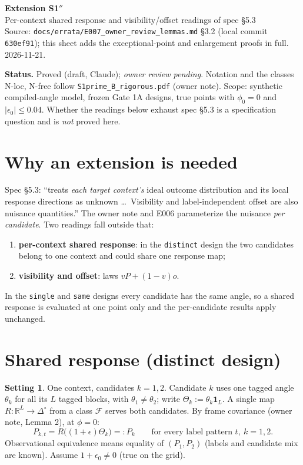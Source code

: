\documentclass[11pt,a4paper]{article}
\newcommand{\statusbox}[1]{\par\smallskip\noindent\colorbox{boxgray}{\parbox{\dimexpr\linewidth-2\fboxsep}{\small #1}}\par\smallskip}
\theoremstyle{plain}
\theoremstyle{definition}
\newtheorem*{setting}{Setting}
\theoremstyle{remark}
\newcommand{\eps}{\epsilon}
\newcommand{\R}{\mathbb{R}}
\newcommand{\simp}{\Delta^{\circ}}
\begin{document}
\begin{center}
{\LARGE\bfseries Extension S1$''$}\\[4pt]
{\large Per-context shared response and visibility/offset readings of spec \S5.3}\\[8pt]
{\small Source: \texttt{docs/errata/E007\_owner\_review\_lemmas.md} \S3.2 (local commit \texttt{630ef91}); this sheet adds the exceptional-point and enlargement proofs in full. 2026-11-21.}
\end{center}

\statusbox{\textbf{Status.} Proved (draft, Claude); \emph{owner review pending}. Notation and the
classes N-loc, N-free follow \texttt{S1prime\_B\_rigorous.pdf} (owner note). Scope: synthetic
compiled-angle model, frozen Gate 1A designs, true points with $\phi_0=0$ and
$|\eps_0|\le 0.04$. Whether the readings below exhaust spec \S5.3 is a specification
question and is \emph{not} proved here.}

\section{Why an extension is needed}
Spec \S5.3: ``treats \emph{each target context's} ideal outcome distribution and its local
response directions as unknown \dots\ Visibility and label-independent offset are also nuisance
quantities.'' The owner note and E006 parameterize the nuisance \emph{per candidate}. Two
readings fall outside that:
\begin{enumerate}[label=(\alph*),itemsep=2pt]
\item \textbf{per-context shared response}: in the \texttt{distinct} design the two candidates
belong to one context and could share one response map;
\item \textbf{visibility and offset}: laws $vP+(1-v)o$.
\end{enumerate}
In the \texttt{single} and \texttt{same} designs every candidate has the same angle, so a shared
response is evaluated at one point only and the per-candidate results apply unchanged.

\section{Shared response (distinct design)}

\begin{setting}
One context, candidates $k=1,2$. Candidate $k$ uses one tagged angle $\theta_k$ for all its
$L$ tagged blocks, with $\theta_1\neq\theta_2$; write $\Theta_k:=\theta_k\mathbf 1_L$. A single
map $R:\R^L\to\simp$ from a class $\mathcal F$ serves both candidates. By frame covariance
(owner note, Lemma 2), at $\phi=0$:
\[
P_{k,t}=R\big((1+\eps)\Theta_k\big)=:P_k\qquad\text{for every label pattern } t,\ k=1,2 .
\]
Observational equivalence means equality of $(P_1,P_2)$ (labels and candidate mix are known).
Assume $1+\eps_0\neq0$ (true on the grid).
\end{setting}
\end{document}
